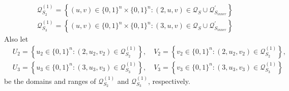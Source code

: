 %
$$
\begin{aligned}
&\mathcal{Q}_{S_2}^{(1)}=\left\{(u, v) \in\{0,1\}^{n} \times\{0,1\}^{n}:(2, u, v) \in \mathcal{Q}_{S} \cup \mathcal{Q}_{S_{inner}}^{\prime}\right\}\\
&\mathcal{Q}_{S_3}^{(1)}=\left\{(u, v) \in\{0,1\}^{n} \times\{0,1\}^{n}:(3, u, v) \in \mathcal{Q}_{S} \cup \mathcal{Q}_{S_{inner}}^{\prime}\right\}
\end{aligned}
$$
%
Also let 
%
$$
\begin{aligned}
&U_2=\left\{u_2 \in\{0,1\}^{n}:\left(2, u_2, v_2\right) \in \mathcal{Q}_{S_2}^{(1)}\right\}, \quad V_2=\left\{v_2 \in\{0,1\}^{n}:\left(2, u_2, v_2\right) \in \mathcal{Q}_{S_2}^{(1)}\right\},\\
&U_3=\left\{u_3 \in\{0,1\}^{n}:\left(3, u_3, v_3\right) \in \mathcal{Q}_{S_3}^{(1)}\right\}, \quad V_3=\left\{v_3 \in\{0,1\}^{n}:\left(3, u_3, v_3\right) \in \mathcal{Q}_{S_3}^{(1)}\right\}
\end{aligned}
$$
%
be the domains and ranges of $\mathcal{Q}_{S_2}^{(1)}$ and $\mathcal{Q}_{S_3}^{(1)}$, respectively.

%
%


